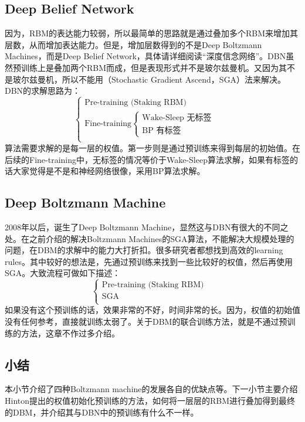 \documentclass[a4paper]{article}
\begin{document}
\subsection{Deep Belief Network}
因为，RBM的表达能力较弱，所以最简单的思路就是通过叠加多个RBM来增加其层数，从而增加表达能力。但是，增加层数得到的不是Deep Boltzmann Machines，而是Deep Belief Network，具体请详细阅读“深度信念网络”。DBN虽然预训练上是叠加两个RBM而成，但是表现形式并不是玻尔兹曼机。又因为其不是玻尔兹曼机，所以不能用（Stochastic Gradient Ascend，SGA）法来解决。DBN的求解思路为：
$$
\left\{
\begin{array}{ll}
      \text{Pre-training (Staking RBM)} & \\
      \text{Fine-training} \left\{
      \begin{array}{ll}
          \text{Wake-Sleep 无标签} &  \\
          \text{BP 有标签} & 
      \end{array} \right.& \\
\end{array}
\right.
$$
算法需要求解的是每一层的权值。第一步则是通过预训练来得到每层的初始值。在后续的Fine-training中，无标签的情况等价于Wake-Sleep算法求解，如果有标签的话大家觉得是不是和神经网络很像，采用BP算法求解。

\subsection{Deep Boltzmann Machine}
2008年以后，诞生了Deep Boltzmann Machine，显然这与DBN有很大的不同之处。在之前介绍的解决Boltzmann Machines的SGA算法，不能解决大规模处理的问题，在DBM的求解中的能力大打折扣。很多研究者都想找到高效的learning rules。其中较好的想法是，先通过预训练来找到一些比较好的权值，然后再使用SGA。大致流程可做如下描述：
$$
\left\{
\begin{array}{ll}
      \text{Pre-training (Staking RBM)} & \\
      \text{SGA} & \\
\end{array}
\right.
$$
如果没有这个预训练的话，效果非常的不好，时间非常的长。因为，权值的初始值没有任何参考，直接就训练太弱了。关于DBM的联合训练方法，就是不通过预训练的方法，这章不作过多介绍。

\subsection{小结}
本小节介绍了四种Boltzmann machine的发展各自的优缺点等。下一小节主要介绍Hinton提出的权值初始化预训练的方法，如何将一层层的RBM进行叠加得到最终的DBM，并介绍其与DBN中的预训练有什么不一样。
\end{document}
